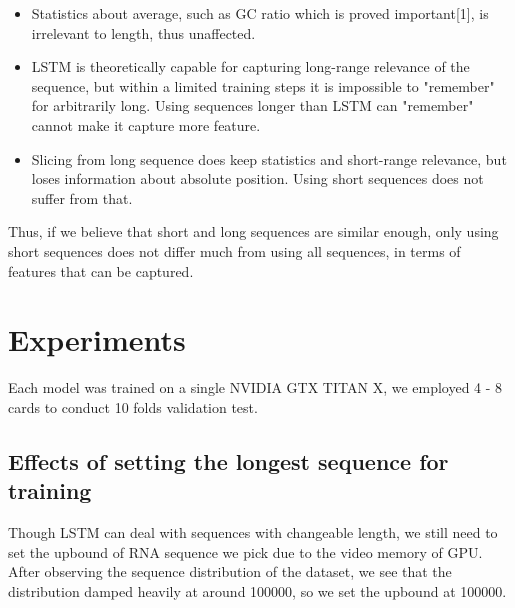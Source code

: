 \documentclass[10pt,a4paper]{article}
\begin{document}
\begin{spacing}{1.5}
		\begin{itemize}
			
			\item Statistics about average, such as GC ratio which is proved important[1], is irrelevant to length, thus unaffected.
			
			\item LSTM is theoretically capable for capturing long-range relevance of the sequence, but within a limited training steps it is impossible to "remember" for arbitrarily long. Using sequences longer than LSTM can "remember" cannot make it capture more feature.
			
			\item Slicing from long sequence does keep statistics and short-range relevance, but loses information about absolute position. Using short sequences does not suffer from that.
			
		\end{itemize}
		
		Thus, if we believe that short and long sequences are similar enough, only using short sequences does not differ much from using all sequences, in terms of features that can be captured.
		
		\section{Experiments}
		
		Each model was trained on a single NVIDIA GTX TITAN X, we employed 4 - 8 cards to conduct 10 folds validation test.
		
		\subsection{Effects of setting the longest sequence for training}
		Though LSTM can deal with sequences with changeable length, we still need to set the upbound of RNA sequence we pick due to the video memory of GPU. After observing the sequence distribution of the dataset, we see that the distribution damped heavily at around 100000, so we set the upbound at 100000.
		

\end{spacing}
\end{document}
